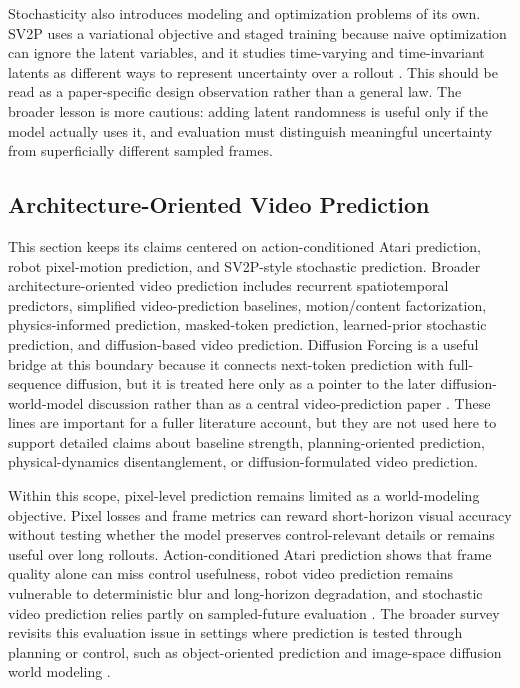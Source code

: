 Stochasticity also introduces modeling and optimization problems of its own. SV2P uses a variational objective and staged training because naive optimization can ignore the latent variables, and it studies time-varying and time-invariant latents as different ways to represent uncertainty over a rollout \cite{babaeizadeh2018_sv2p_prov}. This should be read as a paper-specific design observation rather than a general law. The broader lesson is more cautious: adding latent randomness is useful only if the model actually uses it, and evaluation must distinguish meaningful uncertainty from superficially different sampled frames.

\subsection{Architecture-Oriented Video Prediction}

This section keeps its claims centered on action-conditioned Atari prediction, robot pixel-motion prediction, and SV2P-style stochastic prediction. Broader architecture-oriented video prediction includes recurrent spatiotemporal predictors, simplified video-prediction baselines, motion/content factorization, physics-informed prediction, masked-token prediction, learned-prior stochastic prediction, and diffusion-based video prediction. Diffusion Forcing is a useful bridge at this boundary because it connects next-token prediction with full-sequence diffusion, but it is treated here only as a pointer to the later diffusion-world-model discussion rather than as a central video-prediction paper \cite{chen2024diffusion_forcing_prov}. These lines are important for a fuller literature account, but they are not used here to support detailed claims about baseline strength, planning-oriented prediction, physical-dynamics disentanglement, or diffusion-formulated video prediction.

Within this scope, pixel-level prediction remains limited as a world-modeling objective. Pixel losses and frame metrics can reward short-horizon visual accuracy without testing whether the model preserves control-relevant details or remains useful over long rollouts. Action-conditioned Atari prediction shows that frame quality alone can miss control usefulness, robot video prediction remains vulnerable to deterministic blur and long-horizon degradation, and stochastic video prediction relies partly on sampled-future evaluation \cite{oh2015_action_conditional_video_prediction_prov,finn2016_physical_interaction_video_prediction_prov,babaeizadeh2018_sv2p_prov}. The broader survey revisits this evaluation issue in settings where prediction is tested through planning or control, such as object-oriented prediction and image-space diffusion world modeling \cite{janner2019_o2p2_prov,alonso2024_diamond_prov}.

